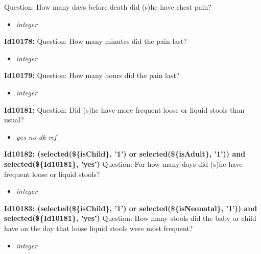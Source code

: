 \documentclass{article}%
\begin{document}
Question: How many days before death did (s)he have chest pain?\newline%
%
\begin{itemize}%
\item%
\textit{integer\newline%
}%
\end{itemize}%
\textbf{Id10178: \newline%
}%
Question: How many minutes did the pain last?\newline%
%
\begin{itemize}%
\item%
\textit{integer\newline%
}%
\end{itemize}%
\textbf{Id10179: \newline%
}%
Question: How many hours did the pain last?\newline%
%
\begin{itemize}%
\item%
\textit{integer\newline%
}%
\end{itemize}%
\textbf{Id10181: \newline%
}%
Question: Did (s)he have more frequent loose or liquid stools than usual?\newline%
%
\begin{itemize}%
\item%
\textit{yes\newline%
 no\newline%
 dk\newline%
 ref\newline%
}%
\end{itemize}%
\textbf{Id10182: (selected(\$\{isChild\}, '1') or selected(\$\{isAdult\}, '1')) and selected(\$\{Id10181\}, 'yes')\newline%
}%
Question: For how many days did (s)he have frequent loose or liquid stools?\newline%
%
\begin{itemize}%
\item%
\textit{integer\newline%
}%
\end{itemize}%
\textbf{Id10183: (selected(\$\{isChild\}, '1') or selected(\$\{isNeonatal\}, '1')) and selected(\$\{Id10181\}, 'yes')\newline%
}%
Question: How many stools did the baby or child have on the day that loose liquid stools were most frequent?\newline%
%
\begin{itemize}%
\item%
\textit{integer\newline%
}%
\end{itemize}%
\end{document}
